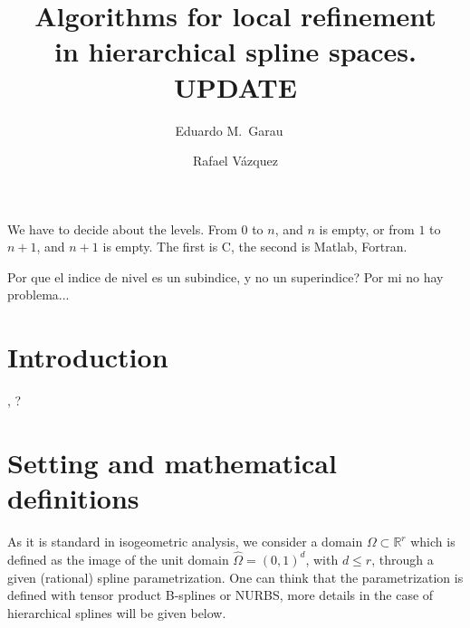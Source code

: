 \documentclass[a4paper]{siamltex1213}
\title{Algorithms for local refinement \\ in hierarchical spline spaces. {\Rd UPDATE}}
\author{Eduardo M.~Garau\footnotemark[1]\ \footnotemark[2]\ \and Rafael V\'azquez\footnotemark[3]}
\newcommand{\Rd}{\color{red}}
\renewcommand{\Rd}{\color{black}}
\newcommand{\snote}[1]{\fbox{\textbf{#1}}}
\newcommand{\RR}{\mathbb R}
\let\hat\widehat
\begin{document}
\maketitle

\renewcommand{\thefootnote}{\fnsymbol{footnote}}
\renewcommand{\thefootnote}{\arabic{footnote}}

% 
%  
% 
% 

{\Rd We have to decide about the levels. From 0 to $n$, and $n$ is empty, or from $1$ to $n+1$, and $n+1$ is empty. The first is C, the second is Matlab, Fortran.}

Por que el indice de nivel es un subindice, y no un superindice? Por mi no hay problema...

\section{Introduction}
\cite{Scott2014222,Bornemann2013584}, \cite{KGJ14}?

\section{Setting and mathematical definitions}
As it is standard in isogeometric analysis, we consider a domain $\Omega \subset \RR^r$ which is defined as the image of the unit domain $\hat \Omega = (0,1)^d$, with $d \le r$, through a given (rational) spline parametrization. One can think that the parametrization is defined with tensor product B-splines or NURBS, more details in the case of hierarchical splines will be given below.
\end{document}
